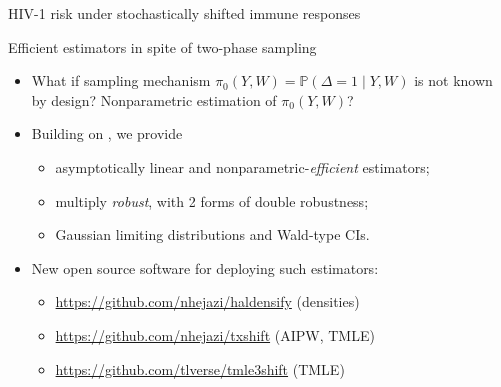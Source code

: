 \documentclass{beamer}
\newcommand{\pr}{\mathbb{P}}
\begin{document}

\begin{frame}[c]{HIV-1 risk under stochastically shifted immune responses}

\centering
{}

\note{
}

\end{frame}


\begin{frame}[c]{Efficient estimators in spite of two-phase sampling}

\begin{center}
\begin{itemize}
  \itemsep10pt
  \item What if sampling mechanism $\pi_0(Y, W) = \pr(\Delta=1 \mid Y,W)$
    is not known by design? Nonparametric estimation of $\pi_0(Y, W)$?
  \item Building on \cite{rose2011targeted2sd}, we provide
    \begin{itemize}
      \itemsep4pt
      \item asymptotically linear and nonparametric-\textit{efficient}
        estimators;
      \item multiply \textit{robust}, with 2 forms of double robustness;
      \item Gaussian limiting distributions and Wald-type CIs.
    \end {itemize}
  \item New open source software for deploying such estimators:
    \begin{itemize}
      \itemsep4pt
      \item \url{https://github.com/nhejazi/haldensify} (densities)
      \item \url{https://github.com/nhejazi/txshift} (AIPW, TMLE)
      \item \url{https://github.com/tlverse/tmle3shift} (TMLE)
    \end {itemize}
\end{itemize}
\end{center}


\end{frame}
\end{document}
